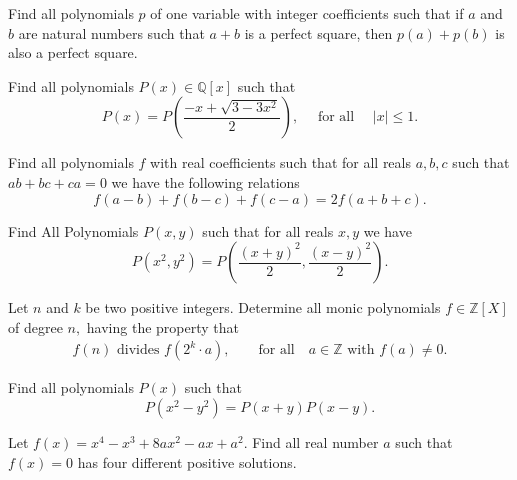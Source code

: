 \begin{question}
Find all polynomials $ p$ of one variable with integer coefficients such that if $ a$ and $ b$ are natural numbers such that $ a +b$ is a perfect square, then $ p\left(a\right)+ p\left(b\right)$ is also a perfect square.
\end{question}





\begin{question}
Find all polynomials $P(x)\in \mathbb Q[x]$ such that
\[P(x)=P\left(\frac{-x+\sqrt{3 -3x^2}}{2}\right), \quad \text{ for all } \quad |x| \le 1.\]
\end{question}





\begin{question}
Find all polynomials $f$ with real coefficients such that for all reals $a,b,c$ such that $ab+bc+ca = 0$ we have the following relations
\[ f(a-b) + f(b-c) + f(c-a) = 2f(a+b+c). \]
\end{question}





\begin{question}
Find All Polynomials $ P(x,y)$ such that for all reals $ x,y$ we have
\[P(x^{2},y^{2}) =P\left(\frac {(x + y)^{2}}{2},\frac {(x - y)^{2}}{2}\right).\]
\end{question}





\begin{question}
Let $ n$ and $ k$ be two positive integers. Determine all monic polynomials $ f\in\mathbb{Z}[X]$ of degree $ n,$ having the property that 
\begin{align*}
    f(n) \text{ divides } f\left (2^{k}\cdot a\right ), \qquad \text{for all} \quad  a\in\mathbb{Z} \text{ with } f(a)\neq 0.
\end{align*}
\end{question}




\begin{question}
Find all polynomials $ P(x)$ such that
\[P(x^2-y^2)=P(x+y)P(x-y).\]
\end{question}





\begin{question}
Let $f(x)=x^4-x^3+8ax^2-ax+a^2$. Find all real number $ a$ such that $f(x)=0$ has four different positive solutions.
\end{question}




